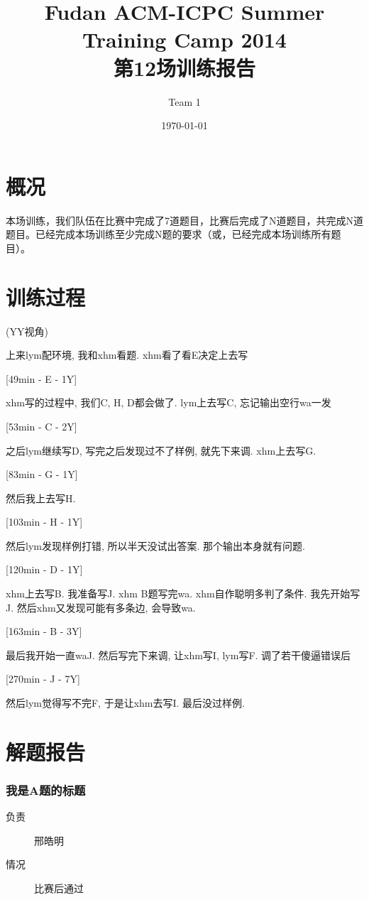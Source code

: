 \documentclass[a4paper, 11pt, nofonts, nocap, fancyhdr]{ctexart}
\title{Fudan ACM-ICPC Summer Training Camp 2014\\第12场训练报告}
\author{Team 1}
\date{\today}
\newcommand{\problem}[1]{\subsubsection{#1}}
\begin{document}
\maketitle

\section{概况}

本场训练，我们队伍在比赛中完成了7道题目，比赛后完成了N道题目，共完成N道题目。已经完成本场训练至少完成N题的要求（或，已经完成本场训练所有题目）。

\section{训练过程}

(YY视角)

上来lym配环境, 我和xhm看题.	xhm看了看E决定上去写

[49min - E - 1Y]

xhm写的过程中, 我们C, H, D都会做了. lym上去写C, 忘记输出空行wa一发

[53min - C - 2Y]

之后lym继续写D, 写完之后发现过不了样例, 就先下来调. xhm上去写G. 

[83min - G - 1Y]

然后我上去写H.

[103min - H - 1Y]

然后lym发现样例打错, 所以半天没试出答案. 那个输出本身就有问题.

[120min - D - 1Y]

xhm上去写B. 我准备写J. xhm B题写完wa. xhm自作聪明多判了条件. 我先开始写J. 然后xhm又发现可能有多条边, 会导致wa.

[163min - B - 3Y]

最后我开始一直waJ. 然后写完下来调, 让xhm写I, lym写F. 调了若干傻逼错误后

[270min - J - 7Y]

然后lym觉得写不完F, 于是让xhm去写I. 最后没过样例.

\section{解题报告}

\problem{我是A题的标题}

\begin{description}
\item[负责] 邢皓明
\item[情况] 比赛后通过
\end{description}
\end{document}
